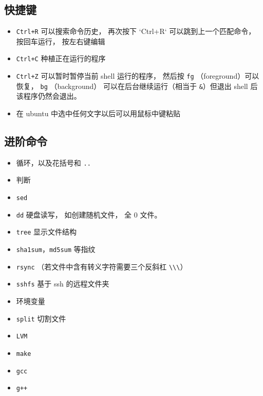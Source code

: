 \subsection{快捷键}
\begin{itemize}
\item \verb|Ctrl+R| 可以搜索命令历史， 再次按下 `Ctrl+R` 可以跳到上一个匹配命令， 按回车运行， 按左右键编辑
\item \verb|Ctrl+C| 种植正在运行的程序
\item \verb|Ctrl+Z| 可以暂时暂停当前 shell 运行的程序， 然后按 \verb|fg| （foreground）可以恢复， \verb|bg| （background） 可以在后台继续运行（相当于 \verb|&|）但退出 shell 后该程序仍然会退出。
\item 在 ubuntu 中选中任何文字以后可以用鼠标中键粘贴
\end{itemize}

\subsection{进阶命令}
\begin{itemize}
\item 循环，以及花括号和 \verb|..|
\item 判断
\item \verb|sed|
\item \verb|dd| 硬盘读写， 如创建随机文件， 全 0 文件。
\item \verb|tree| 显示文件结构
\item \verb|sha1sum|，\verb|md5sum| 等指纹
\item \verb|rsync| （若文件中含有转义字符需要三个反斜杠 \verb|\\\|）
\item \verb|sshfs| 基于 ssh 的远程文件夹
\item 环境变量
\item \verb|split| 切割文件
\item \verb|LVM|
\item \verb|make|
\item \verb|gcc|
\item \verb|g++|
\end{itemize}
